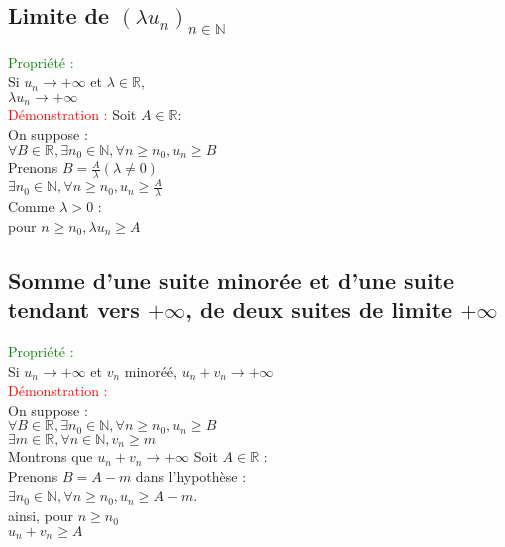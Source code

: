 \documentclass{article}
\begin{document}
	\subsection{Limite de $(\lambda u_n)_{n \in \mathbb{N}}$}
	\textcolor{green}{Propriété :} \\ 
	Si $u_n \rightarrow +\infty$ et $\lambda \in \mathbb{R}$, \\ 
	$\lambda u_n \rightarrow + \infty$ \\ 
	\textcolor{red}{Démonstration :} Soit $A \in \mathbb{R}$: \\ 
	On suppose : \\ 
	$\forall B \in \mathbb{R}, \exists n_0 \in \mathbb{N}, \forall n \geq n_0, u_n \geq B$ \\ 
	Prenons $B=\frac{A}{\lambda} (\lambda \neq 0)$ \\ 
	$\exists n_0 \in \mathbb{N}, \forall n \geq n_0, u_n \geq \frac{A}{\lambda}$ \\ 
	Comme $\lambda > 0$ : \\ 
	pour $n \geq n_0, \lambda u_n \geq A$
	\subsection{Somme d'une suite minorée et d'une suite tendant vers $+ \infty$, de deux suites de limite $+ \infty$}
	\textcolor{green}{Propriété : } \\ 
	Si $u_n \rightarrow + \infty$ et $v_n$ minoréé, $u_n+v_n \rightarrow + \infty$ \\ 
	\textcolor{red}{Démonstration :} \\ 
	On suppose : \\ 
	$\forall B \in \mathbb{R}, \exists n_0 \in \mathbb{N}, \forall n \geq n_0, u_n \geq B$  \\ 
	$\exists m \in \mathbb{R}, \forall n \in \mathbb{N}, v_n \geq m$ \\ 
	Montrons que $u_n +v_n \rightarrow + \infty$
	Soit $A \in \mathbb{R}$ : \\ 
	Prenons $B=A-m$ dans l'hypothèse : \\ 
	$\exists n_0 \in \mathbb{N}, \forall n \geq n_0, u_n \geq A-m$. \\ 
	ainsi, pour $n \geq n_0$ \\ 
	$u_n +v_n \geq A$
\end{document}
